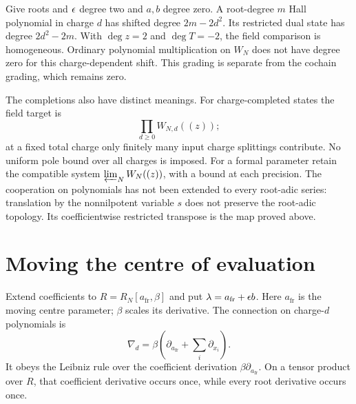 Give roots and $\epsilon$ degree two and $a,b$ degree zero. A root-degree
$m$ Hall polynomial in charge $d$ has shifted degree $2m-2d^2$.
Its restricted dual state has degree $2d^2-2m$. With $\deg z=2$
and $\deg T=-2$, the field comparison is homogeneous. Ordinary
polynomial multiplication on $W_N$ does not have degree zero for
this charge-dependent shift. This grading is separate from the
cochain grading, which remains zero.

The completions also have distinct meanings. For charge-completed
states the field target is
\[
 \prod_{d\geq0}W_{N,d}((z));
\]
at a fixed total charge only finitely many input charge splittings
contribute. No uniform pole bound over all charges is imposed.
For a formal parameter retain the compatible system
$\varprojlim_NW_N((z))$, with a bound at each precision.
The cooperation on polynomials has not been extended to every
root-adic series: translation by the nonnilpotent variable $s$
does not preserve the root-adic topology. Its coefficientwise
restricted transpose is the map proved above.

\section{Moving the centre of evaluation}
\label{cyjets:sec:moving}

Extend coefficients to $R=R_N[a_{\mathrm{fr}},\beta]$ and put
$\lambda=a_{\mathrm{fr}}+\epsilon b$. Here $a_{\mathrm{fr}}$ is the
moving centre parameter; $\beta$ scales its derivative. The connection
on charge-$d$ polynomials is
\begin{equation}\label{cyjets:eq:connection}
 \nabla_d=\beta\left(\partial_{a_{\mathrm{fr}}}
                              +\sum_i\partial_{x_i}\right).
\end{equation}
It obeys the Leibniz rule over the coefficient derivation
$\beta\partial_{a_{\mathrm{fr}}}$. On a tensor product over $R$,
that coefficient derivative occurs once, while every root derivative
occurs once.


